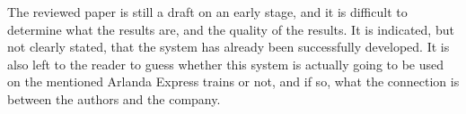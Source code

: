\documentclass[a4paper,10pt]{article}
\begin{document}
The reviewed paper is still a draft on an early stage, and it is difficult to determine what the results are, and the quality of the results. It is indicated, but not clearly stated, that the system has already been successfully developed. It is also left to the reader to guess whether this system is actually going to be used on the mentioned Arlanda Express trains or not, and if so, what the connection is between the authors and the company.


\end{document}
